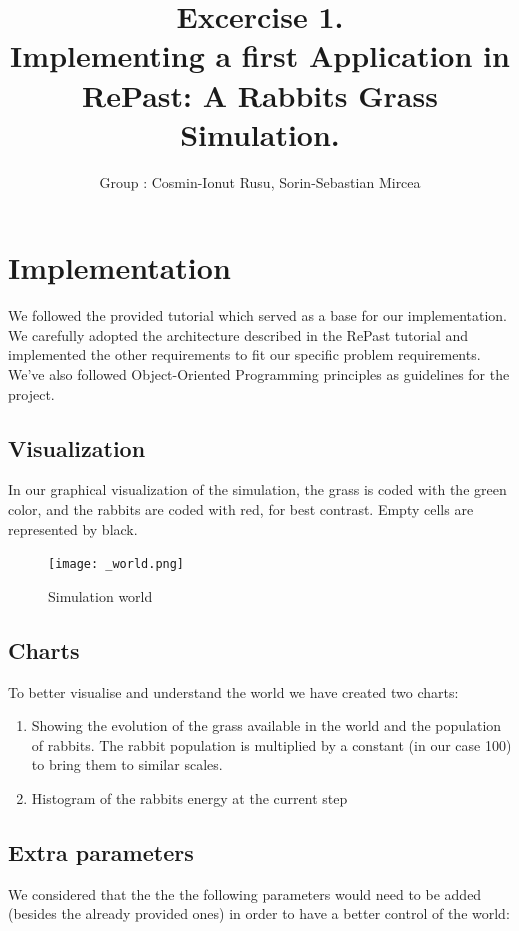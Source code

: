 \documentclass[11pt]{article}
\title{\bf Excercise 1.\\ Implementing a first Application in RePast: A Rabbits Grass Simulation.}
\author{Group \textnumero 10: Cosmin-Ionut Rusu, Sorin-Sebastian Mircea}
\begin{document}
\maketitle

\section{Implementation}


We followed the provided tutorial which served as a base for our implementation. We carefully adopted the architecture described in the RePast tutorial and implemented the other requirements to fit our specific problem requirements. We've also followed Object-Oriented Programming principles as guidelines for the project.

\subsection*{Visualization}

In our graphical visualization of the simulation, the grass is coded with the green color, and the rabbits are coded with red, for best contrast. Empty cells are represented by black.

\begin{figure}[H]
\texttt{[image: \_world.png]}
\centering
\label{fig:world}
\caption{Simulation world}
\end{figure}

\subsection*{Charts}
To better visualise and understand the world we have created two charts:

\begin{enumerate}
\item Showing the evolution of the grass available in the world and the population of rabbits. The rabbit population is multiplied by a constant (in our case 100) to bring them to similar scales.

\item  Histogram of the rabbits energy at the current step
\end{enumerate}

\subsection*{Extra parameters}
We considered that the the the following parameters would need to be added (besides the already provided ones) in order to have a better control of the world:
\end{document}
